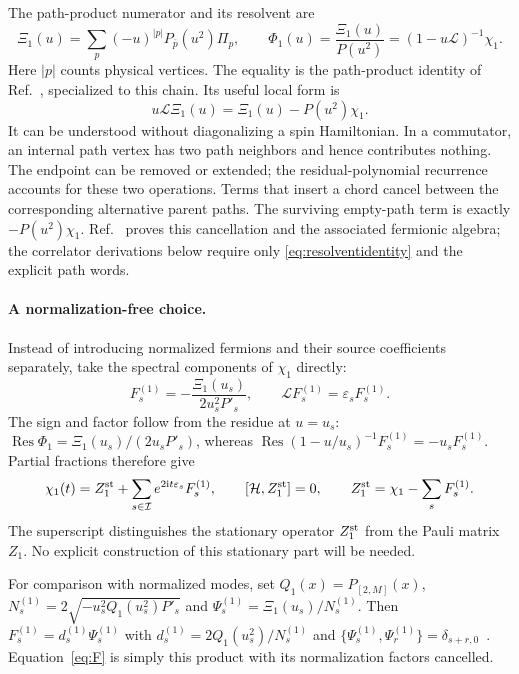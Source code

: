 \documentclass[11pt,a4paper]{article}
\newcommand{\ii}{\mathrm i}
\newcommand{\HH}{\mathcal H}
\newcommand{\LL}{\mathcal L}
\newcommand{\eps}{\varepsilon}
\newcommand{\Sig}{\mathcal I}
\newcommand{\PP}[1]{P_{[#1]}}
\begin{document}
The path-product numerator and its resolvent are
\begin{equation}
 \Xi_1(u)=\sum_p(-u)^{|p|}P_{\overline p}(u^2)\Pi_p,
 \qquad
 \Phi_1(u)=\frac{\Xi_1(u)}{P(u^2)}=(1-u\LL)^{-1}\chi_1.
 \label{eq:Xi}
\end{equation}
Here $|p|$ counts physical vertices. The equality is the path-product identity of Ref.~\cite{FPV}, specialized to this chain. Its useful local form is
\begin{equation}
 u\LL\Xi_1(u)=\Xi_1(u)-P(u^2)\chi_1.
 \label{eq:resolventidentity}
\end{equation}
It can be understood without diagonalizing a spin Hamiltonian. In a commutator, an internal path vertex has two path neighbors and hence contributes nothing. The endpoint can be removed or extended; the residual-polynomial recurrence accounts for these two operations. Terms that insert a chord cancel between the corresponding alternative parent paths. The surviving empty-path term is exactly $-P(u^2)\chi_1$. Ref.~\cite{FPV} proves this cancellation and the associated fermionic algebra; the correlator derivations below require only \eqref{eq:resolventidentity} and the explicit path words.

\paragraph{A normalization-free choice.}
Instead of introducing normalized fermions and their source coefficients separately, take the spectral components of $\chi_1$ directly:
\begin{equation}
 F_s^{(1)}=-\frac{\Xi_1(u_s)}{2u_s^2P'_s},\qquad
 \LL F_s^{(1)}=\eps_sF_s^{(1)}.
 \label{eq:F}
\end{equation}
The sign and factor follow from the residue at $u=u_s$:
$\operatorname{Res}\Phi_1=\Xi_1(u_s)/(2u_sP'_s)$, whereas
$\operatorname{Res}(1-u/u_s)^{-1}F_s^{(1)}=-u_sF_s^{(1)}$.
Partial fractions therefore give
\begin{equation}
 \chi_1(t)=Z_1^{\rm st}+\sum_{s\in\Sig}e^{2\ii t\eps_s}F_s^{(1)},
 \qquad [\HH,Z_1^{\rm st}]=0,\qquad
 Z_1^{\rm st}=\chi_1-\sum_sF_s^{(1)}.
 \label{eq:sourceevol}
\end{equation}
The superscript distinguishes the stationary operator $Z_1^{\rm st}$ from the Pauli matrix $Z_1$. No explicit construction of this stationary part will be needed.

For comparison with normalized modes, set $Q_1(x)=\PP{2,M}(x)$,
$N_s^{(1)}=2\sqrt{-u_s^2Q_1(u_s^2)P'_s}$ and
$\Psi_s^{(1)}=\Xi_1(u_s)/N_s^{(1)}$. Then
$F_s^{(1)}=d_s^{(1)}\Psi_s^{(1)}$ with
$d_s^{(1)}=2Q_1(u_s^2)/N_s^{(1)}$ and
$\{\Psi_s^{(1)},\Psi_r^{(1)}\}=\delta_{s+r,0}$~\cite{FPV}.
Equation~\eqref{eq:F} is simply this product with its normalization factors cancelled.
\end{document}
